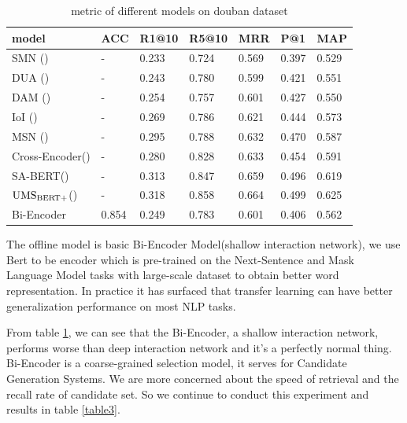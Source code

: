 \documentclass{article}
\begin{document}
\begin{table}[htb]
	\centering
	\caption{metric of different models on douban dataset}
\begin{tabular}{lllllll}
model & ACC & R1@10 & R5@10 & MRR & P@1 & MAP \\
\hline
 SMN (\cite{wu2016sequential}) & - & 0.233 & 0.724 & 0.569 & 0.397 & 0.529 \\
 DUA (\cite{zhang2018modeling}) & - & 0.243 & 0.780 & 0.599 & 0.421 & 0.551 \\
 DAM (\cite{zhou2018multi}) & - & 0.254 & 0.757 & 0.601 & 0.427 & 0.550 \\
 IoI (\cite{tao2019one}) & - & 0.269 & 0.786 & 0.621 & 0.444 & 0.573 \\
 MSN (\cite{yuan2019multi}) & - & 0.295 & 0.788 & 0.632 & 0.470 & 0.587 \\
 \hline
 Cross-Encoder(\cite{gu2020speaker}) & - & 0.280 & 0.828 & 0.633 & 0.454 & 0.591 \\
 SA-BERT(\cite{gu2020speaker}) & - & 0.313 & 0.847 & 0.659 & 0.496 & 0.619 \\
 $\rm {UMS_{BERT+}}$(\cite{whang2020response}) & - & 0.318 & 0.858 & 0.664 & 0.499 & 0.625 \\
 \hline
 Bi-Encoder & 0.854 & 0.249 & 0.783 & 0.601 & 0.406 & 0.562 \\

\end{tabular}
\label{table2}
\end{table}

The offline model is basic Bi-Encoder Model(shallow interaction network), we use Bert to be encoder which is pre-trained on the Next-Sentence and Mask Language Model tasks with large-scale dataset to obtain better word representation. In practice it has surfaced that transfer learning can have better generalization performance on most NLP tasks.

From table \ref{table2}, we can see that the Bi-Encoder, a shallow interaction network, performs worse than deep interaction network and it's a perfectly normal thing. Bi-Encoder is a coarse-grained selection model, it serves for Candidate Generation Systems. We are more concerned about the speed of retrieval and the recall rate of candidate set. So we continue to conduct this experiment and results in table \ref{table3}.
\end{document}
